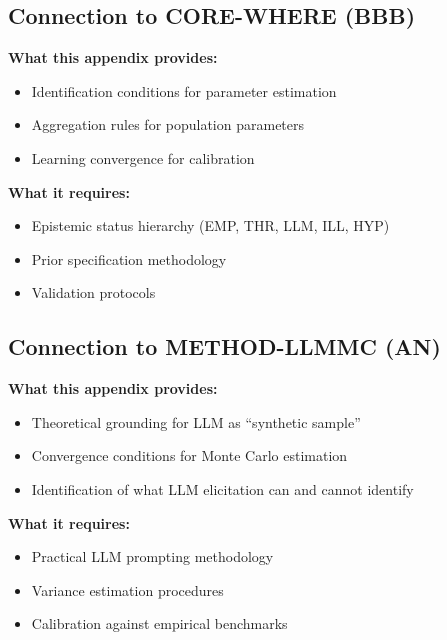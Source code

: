 \subsection{Connection to CORE-WHERE (BBB)}

\begin{tcolorbox}[colback=yellow!5!white, colframe=yellow!75!black,
    title=Integration: METHOD-CONSTRUCT $\leftrightarrow$ CORE-WHERE (BBB)]
\textbf{What this appendix provides:}
\begin{itemize}[nosep]
\item Identification conditions for parameter estimation
\item Aggregation rules for population parameters
\item Learning convergence for calibration
\end{itemize}

\textbf{What it requires:}
\begin{itemize}[nosep]
\item Epistemic status hierarchy (EMP, THR, LLM, ILL, HYP)
\item Prior specification methodology
\item Validation protocols
\end{itemize}
\end{tcolorbox}

\subsection{Connection to METHOD-LLMMC (AN)}

\begin{tcolorbox}[colback=yellow!5!white, colframe=yellow!75!black,
    title=Integration: METHOD-CONSTRUCT $\leftrightarrow$ METHOD-LLMMC (AN)]
\textbf{What this appendix provides:}
\begin{itemize}[nosep]
\item Theoretical grounding for LLM as ``synthetic sample''
\item Convergence conditions for Monte Carlo estimation
\item Identification of what LLM elicitation can and cannot identify
\end{itemize}

\textbf{What it requires:}
\begin{itemize}[nosep]
\item Practical LLM prompting methodology
\item Variance estimation procedures
\item Calibration against empirical benchmarks
\end{itemize}
\end{tcolorbox}


